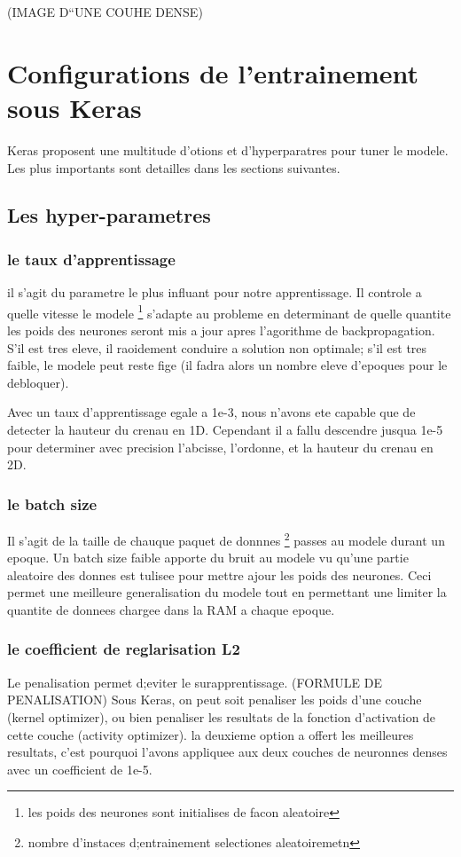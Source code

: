 (IMAGE D``UNE COUHE DENSE)


\section{Configurations de l'entrainement sous Keras}
Keras proposent une multitude d'otions et d'hyperparatres pour tuner le modele. Les plus importants sont detailles dans les sections suivantes.

\subsection{Les hyper-parametres}

\subsubsection{le taux d'apprentissage}
il s'agit du parametre le plus influant pour notre apprentissage. Il controle a quelle vitesse le modele \footnote{les poids des neurones sont initialises de facon aleatoire} s'adapte au probleme en determinant de quelle quantite les poids des neurones seront mis a jour apres l'agorithme de backpropagation. S'il est tres eleve, il raoidement conduire a solution non optimale; s'il est tres faible, le modele peut reste fige (il fadra alors un nombre eleve d'epoques pour le debloquer).

Avec un taux d'apprentissage egale a 1e-3, nous n'avons ete capable que de detecter la hauteur du crenau en 1D. Cependant il a fallu descendre jusqua 1e-5 pour determiner avec precision l'abcisse, l'ordonne, et la hauteur du crenau en 2D.

\subsubsection{le batch size}
Il s'agit de la taille de chauque paquet de donnnes \footnote{nombre d'instaces d;entrainement selectiones aleatoiremetn} passes au modele durant un epoque. Un batch size faible apporte du bruit au modele vu qu'une partie aleatoire des donnes est tulisee pour mettre ajour les poids des neurones. Ceci permet une meilleure generalisation du modele tout en permettant une limiter la quantite de donnees chargee dans la RAM a chaque epoque.

\subsubsection{le coefficient de reglarisation L2}
Le penalisation permet d;eviter le surapprentissage. (FORMULE DE PENALISATION) Sous Keras, on peut soit penaliser les poids d'une couche (kernel optimizer), ou bien penaliser les resultats de la fonction d'activation de cette couche (activity optimizer). la deuxieme option a offert les meilleures resultats, c'est pourquoi l'avons appliquee aux deux couches de neuronnes denses avec un coefficient de 1e-5.

